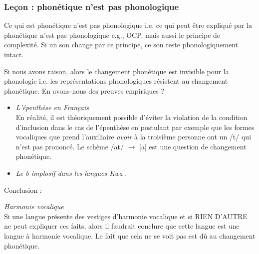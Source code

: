 	\subsubsection{Le\c{c}on : phon\'etique n'est pas phonologique}
	  Ce qui est phon\'etique n'est pas phonologique
	  i.e. ce qui peut \^etre expliqu\'e par la phon\'etique n'est pas phonologique
	  e.g., OCP. mais aussi le principe de complexit\'e. Si un son change par ce principe, ce son reste phonologiquement intact.
	  
	  Si nous avons raison, alors le changement phon\'etique est invisible pour la phonologie i.e. les repr\'esentations phonologiques r\'esistent au changement phon\'etique. En avons-nous des preuves empiriques ?
	  \begin{itemize}
	  	\item \textit{L'\'epenth\`ese en Fran\c{c}ais}\\
	  	En r\'ealit\'e, il est th\'eoriquement possible d'\'eviter la violation de la condition d'inclu\-sion dans le cas de l'\'epenth\`ese en postulant par exemple que les formes vocaliques que prend l'auxiliaire \textit{avoir} \`a la troisi\`eme personne ont un /t/ qui n'est pas prononc\'e. Le sch\`eme /at/ $ \rightarrow $ [a] est une question de changement phon\'etique. 
	  	\item \textit{Le b implosif dans les langues Kwa} \cite[cf.][]{bogny2014}.
	  \end{itemize}
	  Conclusion : 
	  
	   
	  \begin{appli}
	  \textit{Harmonie vocalique}\\
	    Si une langue pr\'esente des vestiges d'harmonie vocalique et si RIEN D'AUTRE ne peut expliquer ces faits, alors il faudrait conclure que cette langue est une langue \`a harmonie vocalique. Le fait que cela ne se voit pas est dû au changement phon\'etique.
	  \end{appli} 
